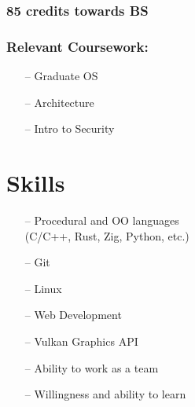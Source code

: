 \documentclass[11pt]{article}
\begin{document}
\subsubsection{85 credits towards BS}
\subsubsection{Relevant Coursework:}
\begin{multicols}{3}
{
\begin{itemize}[noitemsep, topsep=0pt]
	\item[--] Graduate OS
	\item[--] Architecture
	\item[--] Intro to Security
\end{itemize}
}
\end{multicols}


\section{Skills}
\noindent
\begin{multicols}{3}
{
\begin{itemize}[noitemsep, topsep=0pt]
	\item[--] Procedural and OO languages \\(C/C++, Rust, Zig, Python, etc.)
	\item[--] Git
	\item[--] Linux
	\item[--] Web Development
	\item[--] Vulkan Graphics API\\
	\item[--] Ability to work as a team
	\item[--] Willingness and ability to learn
\end{itemize}
}
\end{multicols}
\end{document}

